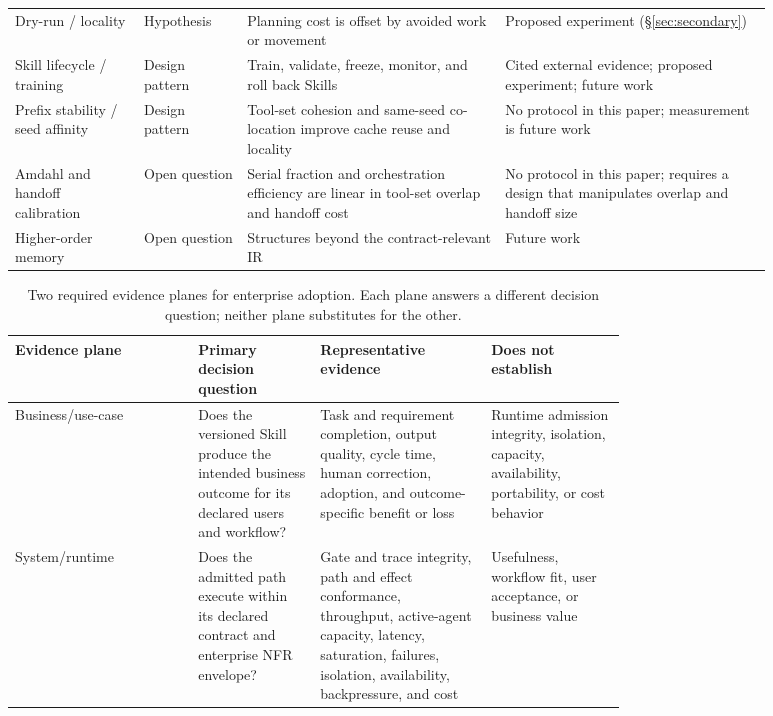 \documentclass[11pt]{article}
\begin{document}
\begin{table}[H]
\begin{tabular}{p{0.15\linewidth}p{0.12\linewidth}p{0.30\linewidth}p{0.31\linewidth}}
Dry-run / locality & Hypothesis & Planning cost is offset by avoided work or movement & Proposed experiment (\S\ref{sec:secondary}) \\
Skill lifecycle / training & Design pattern & Train, validate, freeze, monitor, and roll back Skills & Cited external evidence; proposed experiment; future work \\
Prefix stability / seed affinity & Design pattern & Tool-set cohesion and same-seed co-location improve cache reuse and locality & No protocol in this paper; measurement is future work \\
Amdahl and handoff calibration & Open question & Serial fraction and orchestration efficiency are linear in tool-set overlap and handoff cost & No protocol in this paper; requires a design that manipulates overlap and handoff size \\
Higher-order memory & Open question & Structures beyond the contract-relevant IR & Future work \\
\hline
\end{tabular}
\end{table}

\begin{table}[H]
\centering
\small
\caption{Two required evidence planes for enterprise adoption. Each plane answers a different decision question; neither plane substitutes for the other.}
\label{tab:evidence-planes}
\begin{tabular}{lp{0.20\linewidth}p{0.29\linewidth}p{0.22\linewidth}}
\hline
Evidence plane & Primary decision question & Representative evidence & Does not establish \\
\hline
Business/use-case & Does the versioned Skill produce the intended business outcome for its declared users and workflow? & Task and requirement completion, output quality, cycle time, human correction, adoption, and outcome-specific benefit or loss & Runtime admission integrity, isolation, capacity, availability, portability, or cost behavior \\
System/runtime & Does the admitted path execute within its declared contract and enterprise NFR envelope? & Gate and trace integrity, path and effect conformance, throughput, active-agent capacity, latency, saturation, failures, isolation, availability, backpressure, and cost & Usefulness, workflow fit, user acceptance, or business value \\
\hline
\end{tabular}
\end{table}
\end{document}
